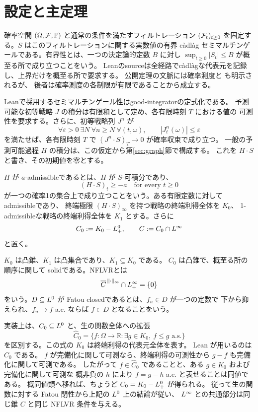 \section{設定と主定理}

確率空間 $(\Omega,\mathcal F,\mathbb P)$ と通常の条件を満たすフィルトレーション
$(\mathcal F_t)_{t\geq0}$ を固定する。$S$ はこのフィルトレーションに関する実数値の有界
c\`adl\`ag セミマルチンゲールである。有界性とは、一つの決定論的定数 $B$ に対し
$\sup_{t\geq0}|S_t|\leq B$ が概至る所で成り立つことをいう。
Leanのsourceは全経路でc\`adl\`agな代表元を記録し、上界だけを概至る所で要求する。
公開定理の文脈には確率測度と  も明示されるが、
後者は確率測度の各制限が有限であることから成立する。

Leanで採用するセミマルチンゲール性はgood-integratorの定式化である。
予測可能な初等戦略 $J$ の積分は有限和として定め、各有限時刻 $T$ における値の
可測性を要求する。さらに、初等戦略列 $J^n$ が
\[
 \forall\varepsilon>0\ \exists N\ \forall n\geq N\ \forall(t,\omega),
 \qquad |J^n_t(\omega)|\leq\varepsilon
\]
を満たせば、各有限時刻 $T$ で $(J^n\mathbin{\cdot}S)_T\to0$ が確率収束で成り立つ。
一般の予測可能過程 $H$ の積分は、この仮定から第\ref{sec:graph}節で構成する。
これを $H\mathbin{\cdot}S$ と書き、その初期値を零とする。

\begin{definition}
$H$ が $a$-admissibleであるとは、$H$ が $S$-可積分であり、
\[
 (H\mathbin{\cdot}S)_t\geq-a
 \quad\text{for every }t\geq0
\]
が一つの確率1の集合上で成り立つことをいう。ある有限定数に対して admissibleであり、
終端極限 $(H\mathbin{\cdot}S)_\infty$ を持つ戦略の終端利得全体を $K_0$、
1-admissibleな戦略の終端利得全体を $K_1$ とする。さらに
\[
 C_0:=K_0-L^0_+,
 \qquad
 C:=C_0\cap L^\infty
\]
と置く。
\end{definition}

$K_0$ は凸錐、$K_1$ は凸集合であり、$K_1\subseteq K_0$ である。
$C_0$ は凸錐で、概至る所の順序に関して solidである。NFLVRとは
\[
 \overline C^{\,\|\cdot\|_\infty}\cap L^\infty_+=\{0\}
\]
をいう。$D\subseteq L^0$ が Fatou closedであるとは、$f_n\in D$ が一つの定数で
下から抑えられ、$f_n\to f$ a.e. ならば $f\in D$ となることをいう。

実装上は、$C_0\subseteq L^0$ と、生の関数全体への拡張
\[
 \widehat C_0=\{f:\Omega\to\mathbb R:\exists g\in K_0,\ f\leq g\text{ a.s.}\}
\]
を区別する。この式の $K_0$ は終端利得の代表元全体を表す。
Lean が用いるのは $\widehat C_0$ である。
$f$ が完備化に関して可測なら、終端利得の可測性から $g-f$ も完備化に関して可測である。
したがって $f\in\widehat C_0$ であることと、ある $g\in K_0$ および完備化に関して可測な
概非負の $h$ により $f=g-h$ a.e. と表せることは同値である。
概同値類へ移れば、ちょうど $C_0=K_0-L^0_+$ が得られる。
従って生の関数に対する Fatou 閉性から上記の $L^0$ 上の結論が従い、
$L^\infty$ との共通部分は同じ錐 $C$ と同じ NFLVR 条件を与える。

